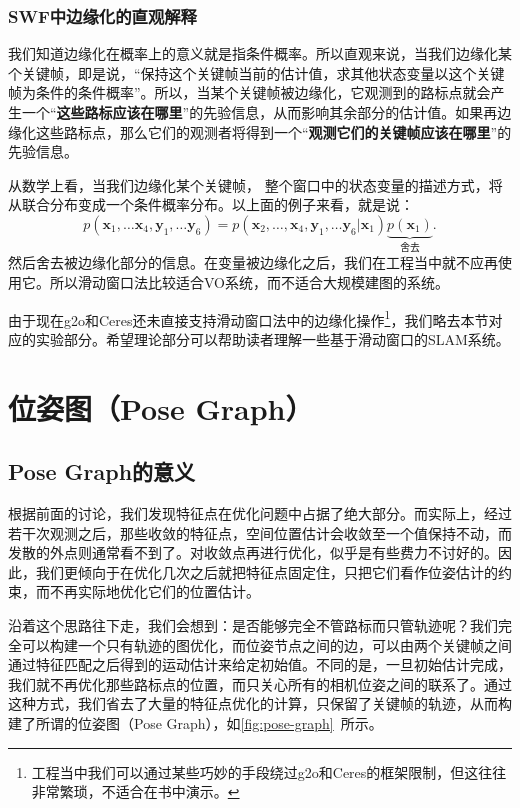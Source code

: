 \subsubsection{SWF中边缘化的直观解释}
我们知道边缘化在概率上的意义就是指条件概率。所以直观来说，当我们边缘化某个关键帧，即是说，“保持这个关键帧当前的估计值，求其他状态变量以这个关键帧为条件的条件概率”。所以，当某个关键帧被边缘化，它观测到的路标点就会产生一个“\textbf{这些路标应该在哪里}”的先验信息，从而影响其余部分的估计值。如果再边缘化这些路标点，那么它们的观测者将得到一个“\textbf{观测它们的关键帧应该在哪里}”的先验信息。

从数学上看，当我们边缘化某个关键帧， 整个窗口中的状态变量的描述方式，将从联合分布变成一个条件概率分布。以上面的例子来看，就是说：
\begin{equation}
p\left( {{\bm{x}_1}, \ldots {\bm{x}_4},{\bm{y}_1}, \ldots {\bm{y}_6}} \right) = p\left( {{\bm{x}_2}, \ldots ,{\bm{x}_4},{\bm{y}_1}, \ldots {\bm{y}_6}|{\bm{x}_1}} \right)\underbrace {p\left( {{\bm{x}_1}} \right)}_{\text{舍去}}.
\end{equation}
然后舍去被边缘化部分的信息。在变量被边缘化之后，我们在工程当中就不应再使用它。所以滑动窗口法比较适合VO系统，而不适合大规模建图的系统。

由于现在g2o和Ceres还未直接支持滑动窗口法中的边缘化操作\footnote{工程当中我们可以通过某些巧妙的手段绕过g2o和Ceres的框架限制，但这往往非常繁琐，不适合在书中演示。}，我们略去本节对应的实验部分。希望理论部分可以帮助读者理解一些基于滑动窗口的SLAM系统。

\section{位姿图（Pose Graph）}
\subsection{Pose Graph的意义}
根据前面的讨论，我们发现特征点在优化问题中占据了绝大部分。而实际上，经过若干次观测之后，那些收敛的特征点，空间位置估计会收敛至一个值保持不动，而发散的外点则通常看不到了。对收敛点再进行优化，似乎是有些费力不讨好的。因此，我们更倾向于在优化几次之后就把特征点固定住，只把它们看作位姿估计的约束，而不再实际地优化它们的位置估计。

沿着这个思路往下走，我们会想到：是否能够完全不管路标而只管轨迹呢？我们完全可以构建一个只有轨迹的图优化，而位姿节点之间的边，可以由两个关键帧之间通过特征匹配之后得到的运动估计来给定初始值。不同的是，一旦初始估计完成，我们就不再优化那些路标点的位置，而只关心所有的相机位姿之间的联系了。通过这种方式，我们省去了大量的特征点优化的计算，只保留了关键帧的轨迹，从而构建了所谓的位姿图（Pose Graph），如\autoref{fig:pose-graph}~所示。

